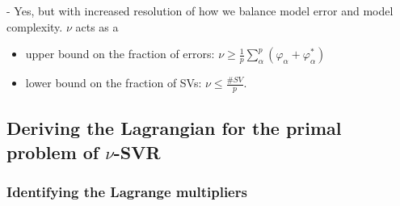 \begin{frame}
     - Yes, but with increased resolution of how we balance model error and model complexity. %
     $\nu$ acts as a
     \begin{itemize}
     \item upper bound on the fraction of errors: $\nu \ge \frac{1}{p} \sum_{\alpha}^p (\varphi_\alpha + \varphi_\alpha^*)$
     \item lower bound on the fraction of SVs: $\nu \le \frac{\# SV}{p}$.
     \end{itemize}
\end{frame}

\newpage

\subsection{Deriving the Lagrangian for the primal problem of $\nu$-SVR}

\subsubsection{Identifying the Lagrange multipliers}

